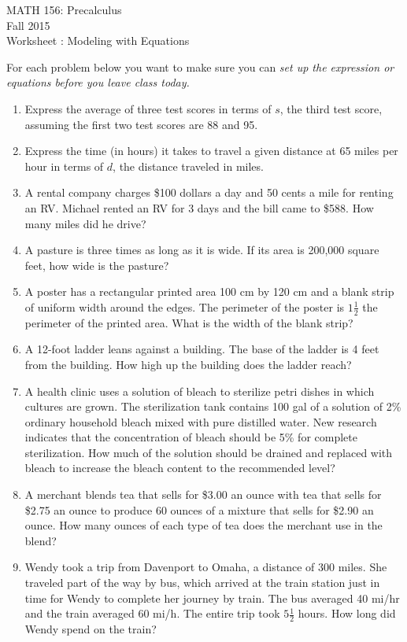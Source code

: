 \documentclass[11pt]{article}
\newcommand{\sect}{\textsection}
\begin{document}
 

\begin{center}MATH 156: Precalculus  \\ Fall 2015 \\ Worksheet \sect 1.7: Modeling with Equations\end{center}

\hrulefill

For each problem below you want to make sure you can {\it{set up the expression or equations before you leave class today.}}

\begin{enumerate}
\item  Express the average of three test scores in terms of $s$, the third test score, assuming the first two test scores are 88 and 95.
\vfill
\item Express the time (in hours) it takes to travel a given distance at 65 miles per hour in terms of $d$, the distance traveled in miles.
\vfill
\item A rental company charges \$100 dollars a day and 50 cents a mile for renting an RV. Michael rented an RV for 3 days and the bill came to \$588. How many miles did he drive?
\vfill
\item A pasture is three times as long as it is wide. If its area is 200,000 square feet, how wide is the pasture?
\vfill
\item A poster has a rectangular printed area 100 cm by 120 cm and a blank strip of uniform width around the edges. The perimeter of the poster is $1\frac{1}{2}$ the perimeter of the printed area. What is the width of the blank strip?
\vspace{2in}
\newpage
\item A 12-foot ladder leans against a building. The base of the ladder is 4 feet from the building. How high up the building does the ladder reach?
\vfill 
\item A health clinic uses a solution of bleach to sterilize petri dishes in which cultures are grown. The sterilization tank contains 100 gal of a solution of 2\% ordinary household bleach mixed with pure distilled water. New research indicates that the concentration of bleach should be 5\% for complete sterilization. How much of the solution should be drained and replaced with bleach to increase the bleach content to the recommended level?
\vfill
\item A merchant blends tea that sells for \$3.00 an ounce with tea that sells for \$2.75 an ounce to produce 60 ounces of a mixture that sells for \$2.90 an ounce. How many ounces of each type of tea does the merchant use in the blend?
\vfill
\item Wendy took a trip from Davenport to Omaha, a distance of 300 miles. She traveled part of the way by bus, which arrived at the train station just in time for Wendy to complete her journey by train. The bus averaged 40 mi/hr and the train averaged 60 mi/h. The entire trip took $5\frac{1}{2}$ hours. How long did Wendy spend on the train?
\vfill

\end{enumerate}
\end{document}
